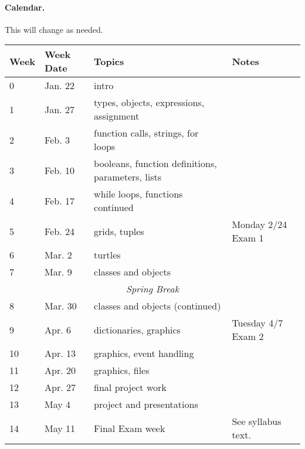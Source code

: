 \documentclass[12pt]{article}
\begin{document}
\paragraph*{Calendar.} This will change as needed.

\begin{longtable}{| l | l | p{2.5in} | l |}
  \hline
  \textbf{Week} & \textbf{Week Date} & \textbf{Topics} & \textbf{Notes}\\\hline\hline
  0 & Jan. 22 & intro  & \\\hline  
  1 & Jan. 27 & types, objects, expressions, assignment  & \\\hline
  2 & Feb. 3 & function calls, strings, for loops & \\\hline
  3 & Feb. 10 & booleans, function definitions, parameters, lists & \\\hline
  4 & Feb. 17  & while loops, functions continued & \\\hline
  5 & Feb. 24 & grids, tuples & Monday 2/24 Exam 1 \\\hline
  6 & Mar. 2 & turtles & \\\hline
  7 & Mar. 9 & classes and objects & \\\hline
  \multicolumn{4}{|c|}{\textit{Spring Break}}\\\hline
  8 & Mar. 30 & classes and objects (continued) & \\\hline
  9 & Apr. 6 & dictionaries, graphics & Tuesday 4/7 Exam 2\\\hline
  10 & Apr. 13 & graphics, event handling & \\\hline
  11 & Apr. 20 & graphics, files & \\\hline
  12 & Apr. 27 & final project work & \\\hline
  13 & May 4 & project and presentations & \\\hline
  14 & May 11 & Final Exam week & \parbox[t]{2in}{See syllabus text.} \\\hline
  
  \hline
\end{longtable}
\end{document}
